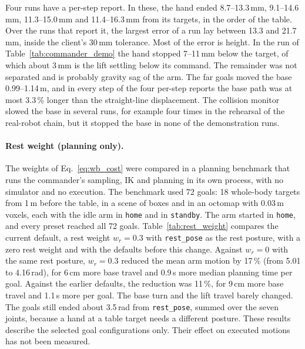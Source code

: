 \documentclass[12pt,a4paper]{article}
\begin{document}
Four runs have a per-step report. In these, the hand ended 8.7--13.3\,mm, 9.1--14.6\,mm, 11.3--15.0\,mm
and 11.4--16.3\,mm from its targets, in the order of the table. Over the runs that report it, the
largest error of a run lay between 13.3 and 21.7\,mm, inside the client's 30\,mm tolerance. Most of
the error is height.
In the run of Table~\ref{tab:commander_demo} the hand stopped 7--11\,mm below the target, of which
about 3\,mm is the lift settling below its command. The remainder was not separated and is probably
gravity sag of the arm. The far goals moved the base 0.99--1.14\,m, and in every step of the four
per-step reports the base path was at most 3.3\,\% longer than the straight-line displacement. The
collision monitor slowed the base in several runs, for example four times in the rehearsal of the
real-robot chain, but it stopped the base in none of the demonstration runs.

\paragraph{Rest weight (planning only).}
The weights of Eq.~\eqref{eq:wb_cost} were compared in a planning benchmark that runs the commander's
sampling, IK and planning in its own process, with no simulator and no execution. The benchmark used 72
goals: 18 whole-body targets from 1\,m before the table, in a scene of boxes and in an octomap with
0.03\,m voxels, each with the idle arm in \texttt{home} and in \texttt{standby}. The arm started in
\texttt{home}, and every preset reached all 72 goals. Table~\ref{tab:rest_weight} compares the current
default, a rest weight $w_r=0.3$ with \texttt{rest\_pose} as the rest posture, with a zero rest weight
and with the defaults before this change. Against $w_r=0$ with the same rest posture, $w_r=0.3$
reduced the mean arm motion by 17\,\% (from 5.01 to 4.16\,rad), for 6\,cm more base travel and 0.9\,s
more median planning time per goal. Against the earlier defaults, the reduction was 11\,\%, for 9\,cm
more base travel and 1.1\,s more per goal. The base turn and the lift travel barely changed. The goals
still ended about 3.5\,rad from \texttt{rest\_pose}, summed over the seven joints, because a hand at a
table target needs a different posture. These results describe the selected goal configurations only.
Their effect on executed motions has not been measured.
\end{document}
